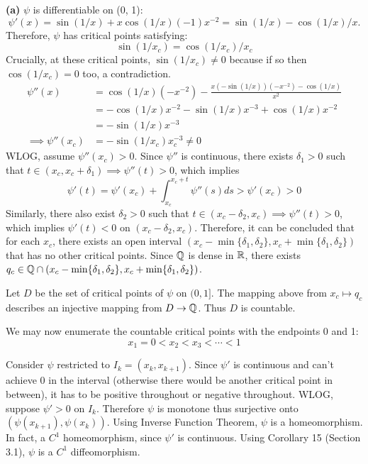 \documentclass[a4paper, 12pt]{article}
\begin{document}
\begin{solution}
    \textbf{(a)} 
    $\psi$ is differentiable on (0, 1):
    \[
        \psi'(x) = \sin(1/x) + x\cos(1/x)(-1)x^{-2} = \sin(1/x) - \cos(1/x)/x.
    \]
    Therefore, $\psi$ has critical points satisfying: \[
    \sin(1/x_c) = \cos(1/x_c)/x_c
    \]
    Crucially, at these critical points, $\sin(1/x_c) \neq 0 $ because if so then $\cos(1/x_c) = 0 $ too, a contradiction.
    \begin{align*}
        \psi''(x) &= \cos(1/x)(-x^{-2}) - \frac{x(-\sin(1/x))(-x^{-2}) - \cos(1/x)}{x^2} \\
        &= -\cos(1/x)x^{-2} - \sin(1/x)x^{-3} + \cos(1/x)x^{-2}\\
        &= -\sin(1/x)x^{-3} \\
        \implies \psi''(x_c) &= -\sin(1/x_c)x_c^{-3} \neq 0
    \end{align*}
    WLOG, assume $\psi''(x_c) > 0$. Since $\psi''$ is continuous, there exists $\delta_1 > 0$ such that $t \in (x_c, x_c + \delta_1) \implies \psi''(t) > 0$, which implies \[
    \psi'(t) = \psi'(x_c) + \int_{x_c}^{x_c+t} \psi''(s) ds > \psi'(x_c) > 0
    \]
    Similarly, there also exist $\delta_2 > 0$ such that $t \in (x_c - \delta_2, x_c) \implies \psi''(t) > 0$, which implies $\psi'(t) < 0$ on $(x_c - \delta_2, x_c)$. Therefore, it can be concluded that for each $x_c$, there exists an open interval $(x_c - \min\{\delta_1, \delta_2\}, x_c + \min\{\delta_1, \delta_2\})$ that has no other critical points. Since $\mathbb{Q}$ is dense in $\mathbb{R}$, there exists $q_c \in \mathbb{Q} \cap (x_c - \min\{\delta_1, \delta_2\}, x_c + \min\{\delta_1, \delta_2\})$.

    Let $D$ be the set of critical points of $\psi$ on $(0, 1]$. The mapping above from $x_c \mapsto q_c$ describes an injective mapping from $D \to \mathbb{Q}$. Thus $D$ is countable.

    We may now enumerate the countable critical points with the endpoints 0 and 1:
    \[
    x_1 = 0 < x_2 < x_3 < \cdots < 1
    \]

    Consider $\psi$ restricted to $I_k = (x_k, x_{k+1})$. Since $\psi'$ is continuous and can't achieve 0 in the interval (otherwise there would be another critical point in between), it has to be positive throughout or negative throughout. WLOG, suppose $\psi' > 0$ on $I_k$. Therefore $\psi$ is monotone thus surjective onto $(\psi(x_{k+1}), \psi(x_k))$. Using Inverse Function Theorem, $\psi$ is a homeomorphism. In fact, a $C^1$ homeomorphism, since $\psi'$ is continuous. Using Corollary 15 (Section 3.1), $\psi$ is a $C^1$ diffeomorphism.


\end{solution}
\end{document}
